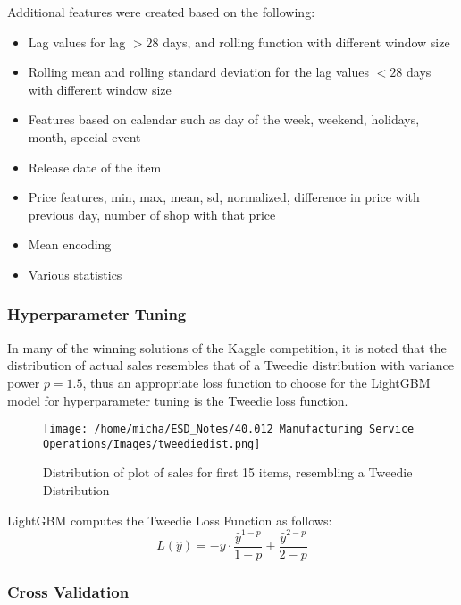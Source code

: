\documentclass[12pt]{article}
\begin{document}
Additional features were created based on the following: \begin{itemize}
    \item Lag values for lag $> 28$ days, and rolling function with different window size
    \item Rolling mean and rolling standard deviation for the lag values $< 28$ days with different window size
    \item Features based on calendar such as day of the week, weekend, holidays, month, special event 
    \item Release date of the item
    \item Price features, min, max, mean, sd, normalized, difference in price with previous day, number of shop with that price
    \item Mean encoding
    \item Various statistics
\end{itemize}

\subsubsection*{Hyperparameter Tuning}

In many of the winning solutions of the Kaggle competition, it is noted that the distribution of actual sales resembles that of a Tweedie distribution with variance power $p =1.5$, thus an appropriate loss function to choose for the LightGBM model for hyperparameter tuning is the Tweedie loss function. 

\begin{figure}[H]
    \centering
    \texttt{[image: /home/micha/ESD\_Notes/40.012 Manufacturing Service Operations/Images/tweediedist.png]}
    \caption{Distribution of plot of sales for first 15 items, resembling a Tweedie Distribution}
    \label{fig:6-tweedie}
\end{figure} 

\noindent LightGBM computes the Tweedie Loss Function as follows: \begin{equation}
    L(\hat{y}) = -y \cdot \frac{\hat{y}^{1-p}}{1-p} + \frac{\hat{y}^{2-p}}{2-p}
\end{equation}

\subsubsection*{Cross Validation}
\end{document}
